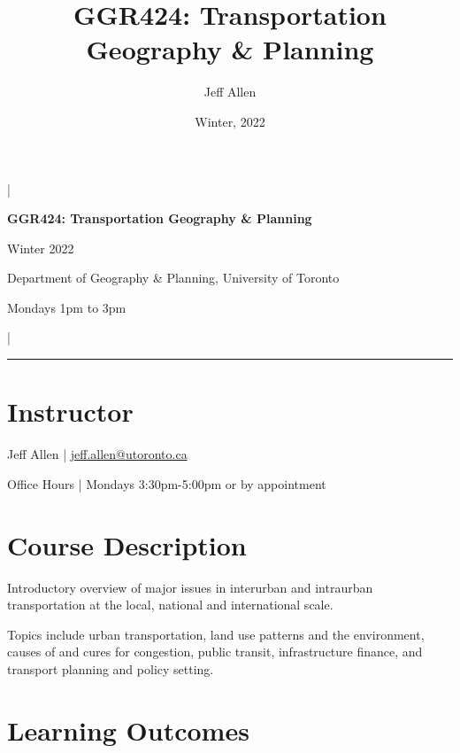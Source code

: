 \documentclass[11pt]{article}
\title{\textbf{GGR424: Transportation Geography \& Planning}}
\author{Jeff Allen}
\date{Winter, 2022}
\begin{document}
	\allsectionsfont{\sffamily}
	
	
	\begin{center}
		
		|
		
		\Large{\textsf{\textbf{GGR424: Transportation Geography \& Planning}}}
		
		\normalsize
		
		Winter 2022
			
		Department of Geography \& Planning, University of Toronto
		
		Mondays 1pm to 3pm
		
		|
		
		
		
		\vspace{5 mm}
		
		\hrule
		
	\end{center}
		

	
	
	
	\vspace{3 mm}
	
	
	\section*{\textsf{Instructor}}
	
	Jeff Allen | \url{jeff.allen@utoronto.ca}
	
	Office Hours | Mondays 3:30pm-5:00pm or by appointment
	
	
	
	
	
	
	
	\section*{Course Description}
	
	Introductory overview of major issues in interurban and intraurban transportation at the local, national and international scale. 
	
	Topics include urban transportation, land use patterns and the environment, causes of and cures for congestion, public transit, infrastructure finance, and transport planning and policy setting. 
	
	
	\section*{Learning Outcomes}
	
\end{document}
